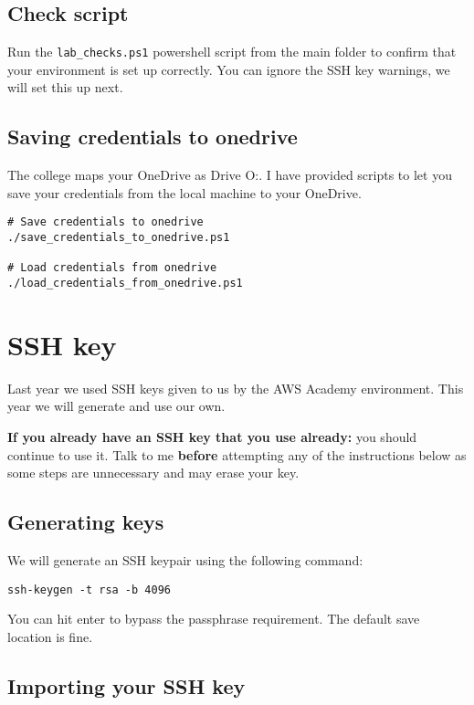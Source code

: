 \documentclass{pgnotes}
\begin{document}
\subsection{Check script}\label{check-script}

Run the \texttt{lab\_checks.ps1} powershell script from the main folder to confirm that your environment is set up correctly.
You can ignore the SSH key warnings, we will set this up next.

\subsection{Saving credentials to onedrive}

The college maps your OneDrive as Drive O:.
I have provided scripts to let you save your credentials from the local machine to your OneDrive.
\begin{verbatim}
# Save credentials to onedrive
./save_credentials_to_onedrive.ps1

# Load credentials from onedrive
./load_credentials_from_onedrive.ps1
\end{verbatim}


\section{SSH key}

Last year we used SSH keys given to us by the AWS Academy environment.
This year we will generate and use our own.

\textbf{If you already have an SSH key that you use already:} you should continue to use it.
Talk to me \textbf{before} attempting any of the instructions below as some steps are unnecessary and may erase your key.

\subsection{Generating keys}

We will generate an SSH keypair using the following command:
\begin{verbatim}
ssh-keygen -t rsa -b 4096
\end{verbatim}
You can hit enter to bypass the passphrase requirement.
The default save location is fine.

\subsection{Importing your SSH key}
\end{document}
